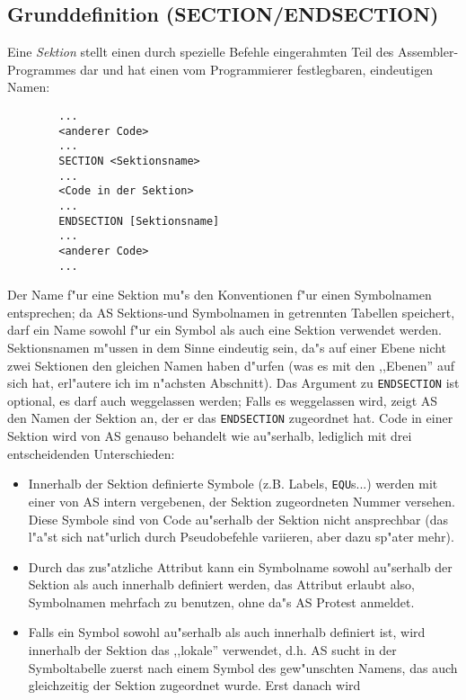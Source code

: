 \documentclass[12pt,a4paper,twoside]{report}
\newcommand{\ii}[1]{{\it #1}}
\newcommand{\tty}[1]{{\tt #1}}
\begin{document}
{%

\subsection{Grunddefinition (SECTION/ENDSECTION)}

Eine \ii{Sektion} stellt einen durch spezielle Befehle eingerahmten
Teil des Assembler-Programmes dar und hat einen vom Programmierer
festlegbaren, eindeutigen Namen:
\begin{verbatim}
        ...
        <anderer Code>
        ...
        SECTION <Sektionsname>
        ...
        <Code in der Sektion>
        ...
        ENDSECTION [Sektionsname]
        ...
        <anderer Code>
        ...
\end{verbatim}
Der Name f"ur eine Sektion mu"s den Konventionen f"ur einen Symbolnamen
entsprechen; da AS Sektions-und Symbolnamen in getrennten Tabellen speichert,
darf ein Name sowohl f"ur ein Symbol als auch eine Sektion verwendet werden.
Sektionsnamen m"ussen in dem Sinne eindeutig sein, da"s auf einer Ebene
nicht zwei Sektionen den gleichen Namen haben d"urfen (was es mit den
,,Ebenen'' auf sich hat, erl"autere ich im n"achsten Abschnitt).  Das Argument
zu \tty{ENDSECTION} ist optional, es darf auch weggelassen werden; Falls
es weggelassen wird, zeigt AS den Namen der Sektion an, der er das
\tty{ENDSECTION} zugeordnet hat.  Code in einer Sektion wird von AS genauso
behandelt wie au"serhalb, lediglich mit drei entscheidenden Unterschieden:
\begin{itemize}
\item{Innerhalb der Sektion definierte Symbole (z.B. Labels, \tty{EQU}s...) werden
      mit einer von AS intern vergebenen, der Sektion zugeordneten Nummer
      versehen.  Diese Symbole sind von Code au"serhalb der Sektion nicht
      ansprechbar (das l"a"st sich nat"urlich durch Pseudobefehle variieren,
      aber dazu sp"ater mehr).}
\item{Durch das zus"atzliche Attribut kann ein Symbolname sowohl au"serhalb
      der Sektion als auch innerhalb definiert werden, das Attribut erlaubt
      also, Symbolnamen mehrfach zu benutzen, ohne da"s AS Protest anmeldet.}
\item{Falls ein Symbol sowohl au"serhalb als auch innerhalb definiert ist,
      wird innerhalb der Sektion das ,,lokale'' verwendet, d.h. AS sucht
      in der Symboltabelle zuerst nach einem Symbol des gew"unschten Namens,
      das auch gleichzeitig der Sektion zugeordnet wurde.  Erst danach wird
}
\end{itemize}}
\end{document}
